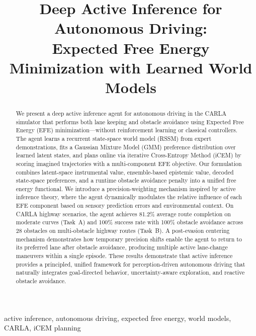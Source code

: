 \documentclass[conference]{IEEEtran}
\begin{document}
\title{Deep Active Inference for Autonomous Driving: \\
Expected Free Energy Minimization with Learned World Models}

\author{
}

\maketitle

\begin{abstract}
We present a deep active inference agent for autonomous driving in the CARLA simulator that performs both lane keeping and obstacle avoidance using Expected Free Energy (EFE) minimization---without reinforcement learning or classical controllers. The agent learns a recurrent state-space world model (RSSM) from expert demonstrations, fits a Gaussian Mixture Model (GMM) preference distribution over learned latent states, and plans online via iterative Cross-Entropy Method (iCEM) by scoring imagined trajectories with a multi-component EFE objective. Our formulation combines latent-space instrumental value, ensemble-based epistemic value, decoded state-space preferences, and a runtime obstacle avoidance penalty into a unified free energy functional. We introduce a precision-weighting mechanism inspired by active inference theory, where the agent dynamically modulates the relative influence of each EFE component based on sensory prediction errors and environmental context. On CARLA highway scenarios, the agent achieves 81.2\% average route completion on moderate curves (Task~A) and 100\% success rate with 100\% obstacle avoidance across 28 obstacles on multi-obstacle highway routes (Task~B). A post-evasion centering mechanism demonstrates how temporary precision shifts enable the agent to return to its preferred lane after obstacle avoidance, producing multiple active lane-change maneuvers within a single episode. These results demonstrate that active inference provides a principled, unified framework for perception-driven autonomous driving that naturally integrates goal-directed behavior, uncertainty-aware exploration, and reactive obstacle avoidance.
\end{abstract}

\begin{IEEEkeywords}
active inference, autonomous driving, expected free energy, world models, CARLA, iCEM planning
\end{IEEEkeywords}
\end{document}
